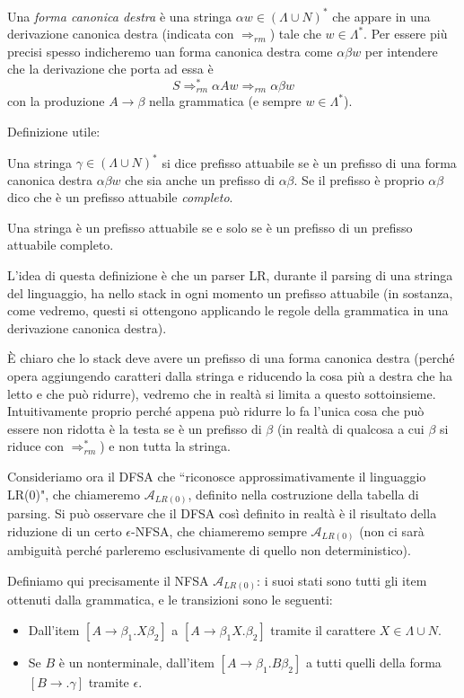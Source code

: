 \documentclass[12pt]{article}
\numberwithin{theorem}{subsection}
\begin{document}
Una \textit{forma canonica destra} è una stringa $\alpha w \in \left( \Lambda \cup N \right)^*$ che appare in una derivazione canonica destra (indicata con $\Rightarrow_{rm}$) tale che $w \in \Lambda^*$. Per essere più precisi spesso indicheremo uan forma canonica destra come $\alpha \beta w$ per intendere che la derivazione che porta ad essa è
\[
S \Rightarrow^*_{rm} \alpha A w \Rightarrow_{rm} \alpha \beta w
\]
con la produzione $A \rightarrow \beta$ nella grammatica (e sempre $w \in \Lambda^*$).

Definizione utile:
\begin{definition}
	Una stringa $\gamma \in \left( \Lambda \cup N \right)^*$ si dice prefisso attuabile se è un prefisso di una forma canonica destra $\alpha\beta w$ che sia anche un prefisso di $\alpha \beta$. Se il prefisso è proprio $\alpha \beta$ dico che è un prefisso attuabile \textit{completo}.
\end{definition}

\begin{remark}
	Una stringa è un prefisso attuabile se e solo se è un prefisso di un prefisso attuabile completo.
\end{remark}

L'idea di questa definizione è che un parser LR, durante il parsing di una stringa del linguaggio, ha nello stack in ogni momento un prefisso attuabile (in sostanza, come vedremo, questi si ottengono applicando le regole della grammatica in una derivazione canonica destra).

È chiaro che lo stack deve avere un prefisso di una forma canonica destra (perché opera aggiungendo caratteri dalla stringa e riducendo la cosa più a destra che ha letto e che può ridurre), vedremo che in realtà si limita a questo sottoinsieme.
Intuitivamente proprio perché appena può ridurre lo fa l'unica cosa che può essere non ridotta è la testa se è un prefisso di $\beta$ (in realtà di qualcosa a cui $\beta$ si riduce con $\Rightarrow^*_{rm}$) e non tutta la stringa.

Consideriamo ora il DFSA che ``riconosce approssimativamente il linguaggio LR(0)", che chiameremo $\mathcal{A}_{LR(0)}$, definito nella costruzione della tabella di parsing. Si può osservare che il DFSA così definito in realtà è il risultato della riduzione di un certo $\epsilon$-NFSA, che chiameremo sempre $\mathcal{A}_{LR(0)}$ (non ci sarà ambiguità perché parleremo esclusivamente di quello non deterministico).

Definiamo qui precisamente il NFSA $\mathcal{A}_{LR(0)}$: i suoi stati sono tutti gli item ottenuti dalla grammatica, e le transizioni sono le seguenti:
\begin{itemize}
	\item Dall'item $[ A \rightarrow \beta_1 . X \beta_2 ]$ a $[ A \rightarrow \beta_1 X . \beta_2 ]$ tramite il carattere $X \in \Lambda \cup N$.
	\item Se $B$ è un nonterminale, dall'item $[ A \rightarrow \beta_1 . B \beta_2 ]$ a tutti quelli della forma $[ B \rightarrow . \gamma ]$ tramite $\epsilon$.
\end{itemize}
\end{document}
